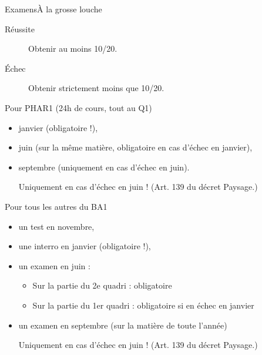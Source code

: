 \begin{frame}{Examens}{À la grosse louche}
  \begin{description}
  \item[Réussite] Obtenir au moins 10/20.
  \item[Échec] Obtenir strictement moins que 10/20.
  \end{description}\pause

  Pour PHAR1 (24h de cours, tout au Q1)
  \begin{itemize}
  \item janvier (obligatoire !),
  \item juin (sur la même matière, obligatoire en cas d'échec en janvier),
  \item septembre (uniquement en cas d'échec en juin).\pause
    \par \small Uniquement en cas d'échec en juin ! (Art. 139 du décret \og Paysage\fg{}.)
  \end{itemize}\pause

  Pour tous les autres du BA1
  \begin{itemize}
  \item un test en novembre,
  \item une interro en janvier (obligatoire !),
  \item un examen en juin :
    \begin{itemize}
    \item Sur la partie du 2e quadri : obligatoire
    \item Sur la partie du 1er quadri : obligatoire si en échec en janvier
    \end{itemize}
  \item un examen en septembre (sur la matière de toute l'année)
    \par \small Uniquement en cas d'échec en juin ! (Art. 139 du décret \og Paysage\fg{}.)
  \end{itemize}
\end{frame}
